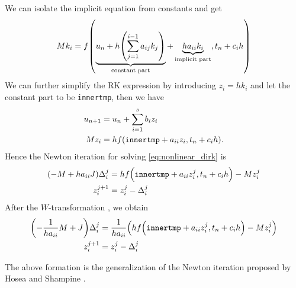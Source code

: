 \documentclass[a4paper,9pt]{article}
\theoremstyle{definition}
\theoremstyle{remark}
\begin{document}
We can isolate the implicit equation from constants and get
\begin{equation}
  M k_i = f\qty(\underbrace{u_n + h\qty(\sum_{j=1}^{i-1} a_{ij} k_j
  )}_\text{constant part} + \underbrace{h a_{ii} k_i}_\text{implicit part},
  t_{n}+c_{i}h)
\end{equation}
We can further simplify the RK expression by introducing $z_i=hk_i$ and let the
constant part to be \texttt{innertmp}, then we
have
\begin{align}
  u_{n+1} &= u_n + \sum_{i=1}^s b_i z_i \\
  M z_i &= h f\qty(\texttt{innertmp} + a_{ii} z_i, t_{n}+c_{i}h)
  \label{eq:nonlinear_dirk}.
\end{align}
Hence the Newton iteration for solving \cref{eq:nonlinear_dirk} is
\begin{align}
  \qty(-M + h a_{ii}J) \Delta^j_i &= h f\qty(\texttt{innertmp} + a_{ii} z^j_i,
  t_{n}+c_{i}h) - M z^j_i \\
  z^{j+1}_i &= z^j_i - \Delta^j_i
\end{align}
After the $W$-transformation \cite[Chapter~IV.5]{hairer2010solving}, we obtain
\begin{align} \label{eq:newton_dirk}
  \qty(-\frac{1}{h a_{ii}}M + J) \Delta^j_i &= \frac{1}{h a_{ii}} \qty(h
  f\qty(\texttt{innertmp} + a_{ii} z^j_i, t_{n}+c_{i}h) - M z^j_i) \\
  z^{j+1}_i &= z^j_i - \Delta^j_i
\end{align}

The above formation is the generalization of the Newton iteration proposed by
Hosea and Shampine \cite{hosea1996analysis}.
\end{document}
